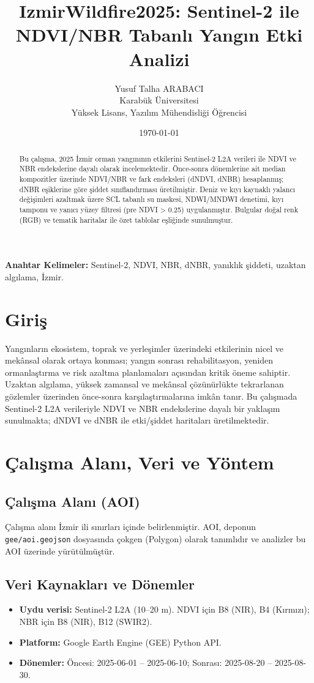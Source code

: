 \documentclass[11pt,a4paper]{article}
\title{IzmirWildfire2025: Sentinel-2 ile NDVI/NBR Tabanlı Yangın Etki Analizi}
\author{Yusuf Talha ARABACI\\Karabük Üniversitesi\\Yüksek Lisans, Yazılım Mühendisliği Öğrencisi}
\date{\today}
\begin{document}
\sloppy
\maketitle
\thispagestyle{empty}

\begin{abstract}
Bu çalışma, 2025 İzmir orman yangınının etkilerini Sentinel-2 L2A verileri ile NDVI ve NBR endekslerine dayalı olarak incelemektedir. Önce-sonra dönemlerine ait median kompozitler üzerinde NDVI/NBR ve fark endeksleri (dNDVI, dNBR) hesaplanmış; dNBR eşiklerine göre şiddet sınıflandırması üretilmiştir. Deniz ve kıyı kaynaklı yalancı değişimleri azaltmak üzere SCL tabanlı su maskesi, NDWI/MNDWI denetimi, kıyı tamponu ve yanıcı yüzey filtresi (pre NDVI > 0.25) uygulanmıştır. Bulgular doğal renk (RGB) ve tematik haritalar ile özet tablolar eşliğinde sunulmuştur.
\end{abstract}

\noindent\textbf{Anahtar Kelimeler:} Sentinel-2, NDVI, NBR, dNBR, yanıklık şiddeti, uzaktan algılama, İzmir.

\clearpage
\tableofcontents
\clearpage
\clearpage

\section{Giriş}
Yangınların ekosistem, toprak ve yerleşimler üzerindeki etkilerinin nicel ve mekânsal olarak ortaya konması; yangın sonrası rehabilitasyon, yeniden ormanlaştırma ve risk azaltma planlamaları açısından kritik öneme sahiptir. Uzaktan algılama, yüksek zamansal ve mekânsal çözünürlükte tekrarlanan gözlemler üzerinden önce-sonra karşılaştırmalarına imkân tanır. Bu çalışmada Sentinel-2 L2A verileriyle NDVI ve NBR endekslerine dayalı bir yaklaşım sunulmakta; dNDVI ve dNBR ile etki/şiddet haritaları üretilmektedir.
\section{Çalışma Alanı, Veri ve Yöntem}
\subsection{Çalışma Alanı (AOI)}
Çalışma alanı İzmir ili sınırları içinde belirlenmiştir. AOI, deponun \texttt{gee/aoi.geojson} dosyasında çokgen (Polygon) olarak tanımlıdır ve analizler bu AOI üzerinde yürütülmüştür.
\subsection{Veri Kaynakları ve Dönemler}
\begin{itemize}
  \item \textbf{Uydu verisi:} Sentinel-2 L2A (10--20 m). NDVI için B8 (NIR), B4 (Kırmızı); NBR için B8 (NIR), B12 (SWIR2).
  \item \textbf{Platform:} Google Earth Engine (GEE) Python API.
  \item \textbf{Dönemler:} Öncesi: 2025-06-01 -- 2025-06-10; Sonrası: 2025-08-20 -- 2025-08-30.
\end{itemize}
\end{document}
